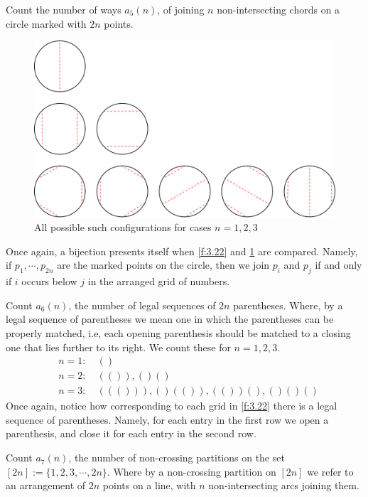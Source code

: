 \begin{question}
Count the number of ways $a_5(n)$, of joining $n$ non-intersecting chords on a circle marked with $2n$ points.     
\end{question}
\begin{solution}
\begin{figure}[H]
    \centering
    \includegraphics[width=0.8\linewidth]{Images/Figure14.png}
    \caption{All possible such configurations for cases $n=1,2,3$}
    \label{f:3.24}
\end{figure}
Once again, a bijection presents itself when \cref{f:3.22} and \cref{f:3.24} are compared. Namely, if $p_1,\cdots,p_{2n}$ are the marked points on the circle, then we join $p_i$ and $p_j$ if and only if $i$ occurs below $j$ in the arranged grid of numbers. 
\end{solution}
\begin{question}
Count $a_6(n)$, the number of legal sequences of $2n$ parentheses. Where, by a legal sequence of parentheses we mean one in which the parentheses can be properly matched, i.e, each opening parenthesis should be matched to a closing one that lies further to its right. We count these for $n=1,2,3$.
\begin{align*}
    & n=1: \quad \left(\right) \\
    & n=2: \quad \left(\left(\right)\right), \left(\right)\left(\right) \\
    & n=3: \quad \left(\left(\left(\right)\right)\right), \left(\right)\left(\left(\right)\right), \left(\left(\right)\right)\left(\right), \left(\right)\left(\right)\left(\right)
\end{align*}
Once again, notice how corresponding to each grid in \cref{f:3.22} there is a legal sequence of parentheses. Namely, for each entry in the first row we open a parenthesis, and close it for each entry in the second row.    
\end{question}
\begin{question}
Count $a_7(n)$, the number of non-crossing partitions on the set $[2n]:=\{1,2,3,\cdots,2n\}$. Where by a non-crossing partition on $[2n]$ we refer to an arrangement of $2n$ points on a line, with $n$ non-intersecting arcs joining them.    
\end{question}
